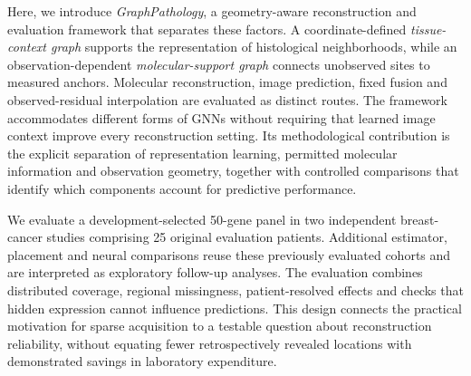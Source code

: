 Here, we introduce \emph{GraphPathology}, a geometry-aware reconstruction and evaluation framework that separates these factors. A coordinate-defined \emph{tissue-context graph} supports the representation of histological neighborhoods, while an observation-dependent \emph{molecular-support graph} connects unobserved sites to measured anchors. Molecular reconstruction, image prediction, fixed fusion and observed-residual interpolation are evaluated as distinct routes. The framework accommodates different forms of GNNs without requiring that learned image context improve every reconstruction setting. Its methodological contribution is the explicit separation of representation learning, permitted molecular information and observation geometry, together with controlled comparisons that identify which components account for predictive performance.

We evaluate a development-selected 50-gene panel in two independent breast-cancer studies comprising 25 original evaluation patients. Additional estimator, placement and neural comparisons reuse these previously evaluated cohorts and are interpreted as exploratory follow-up analyses. The evaluation combines distributed coverage, regional missingness, patient-resolved effects and checks that hidden expression cannot influence predictions. This design connects the practical motivation for sparse acquisition to a testable question about reconstruction reliability, without equating fewer retrospectively revealed locations with demonstrated savings in laboratory expenditure.

